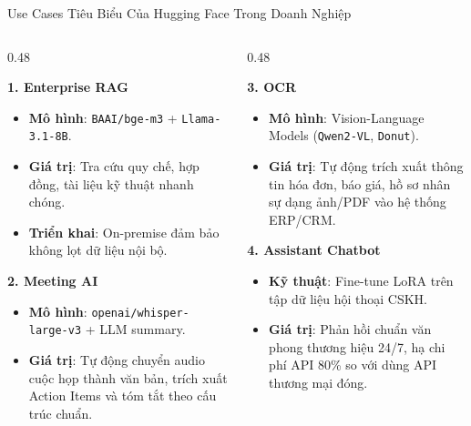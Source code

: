 \documentclass[aspectratio=169, 10pt]{beamer}
\begin{document}
\begin{frame}{Use Cases Tiêu Biểu Của Hugging Face Trong Doanh Nghiệp}
\begin{columns}[T]
  \begin{column}{0.48\textwidth}
    \begin{block}{\textbf{1. Enterprise RAG}}
      \begin{itemize}
        \item \textbf{Mô hình}: \texttt{BAAI/bge-m3} + \texttt{Llama-3.1-8B}.
        \item \textbf{Giá trị}: Tra cứu quy chế, hợp đồng, tài liệu kỹ thuật nhanh chóng.
        \item \textbf{Triển khai}: On-premise đảm bảo không lọt dữ liệu nội bộ.
      \end{itemize}
    \end{block}

    \vspace{0.4em}
    \begin{block}{\textbf{2. Meeting AI}}
      \begin{itemize}
        \item \textbf{Mô hình}: \texttt{openai/whisper-large-v3} + LLM summary.
        \item \textbf{Giá trị}: Tự động chuyển audio cuộc họp thành văn bản, trích xuất Action Items và tóm tắt theo cấu trúc chuẩn.
      \end{itemize}
    \end{block}
  \end{column}

  \begin{column}{0.48\textwidth}
    \begin{block}{\textbf{3. OCR}}
      \begin{itemize}
        \item \textbf{Mô hình}: Vision-Language Models (\texttt{Qwen2-VL}, \texttt{Donut}).
        \item \textbf{Giá trị}: Tự động trích xuất thông tin hóa đơn, báo giá, hồ sơ nhân sự dạng ảnh/PDF vào hệ thống ERP/CRM.
      \end{itemize}
    \end{block}

    \vspace{0.4em}
    \begin{block}{\textbf{4. Assistant Chatbot}}
      \begin{itemize}
        \item \textbf{Kỹ thuật}: Fine-tune LoRA trên tập dữ liệu hội thoại CSKH.
        \item \textbf{Giá trị}: Phản hồi chuẩn văn phong thương hiệu 24/7, hạ chi phí API 80\% so với dùng API thương mại đóng.
      \end{itemize}
    \end{block}
  \end{column}
\end{columns}
\end{frame}
\end{document}
